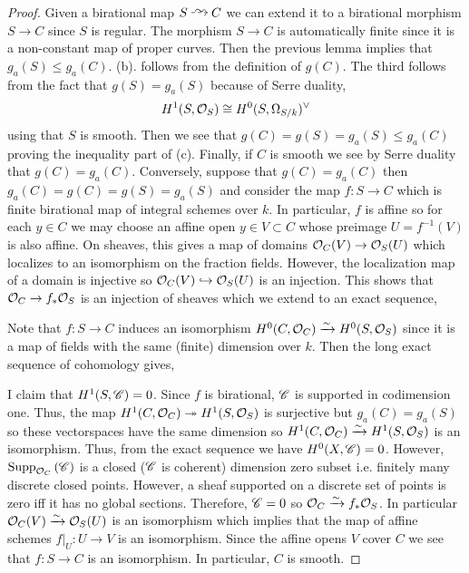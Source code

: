 \documentclass[12pt]{article}
\begin{document}
\begin{proof}
Given a birational map $S \birat C$ we can extend it to a birational morphism $S \to C$ since $S$ is regular. The morphism $S \to C$ is automatically finite since it is a non-constant map of proper curves. Then the previous lemma implies that $g_a(S) \le g_a(C)$. (b). follows from the definition of $g(C)$. The third follows from the fact that $g(S) = g_a(S)$  because of Serre duality, 
\[ H^1(S, \mathcal{O}_{S}) \cong H^0(S, \Omega_{S / k})^\vee \]
using that $S$ is smooth. Then we see that $g(C) = g(S) = g_a(S) \le g_a(C)$ proving the inequality part of (c). Finally, if $C$ is smooth we see by Serre duality that $g(C) = g_a(C)$. Conversely, suppose that $g(C) = g_a(C)$ then $g_a(C) = g(C) = g(S) = g_a(S)$ and consider the map $f : S \to C$ which is finite birational map of integral schemes over $k$. In particular, $f$ is affine so for each $y \in C$ we may choose an affine open $y \in V \subset C$ whose preimage $U = f^{-1}(V)$ is also affine. On sheaves, this gives a map of domains $\mathcal{O}_{C}(V) \to \mathcal{O}_{S}(U)$ which localizes to an isomorphism on the fraction fields. However, the localization map of a domain is injective so $\mathcal{O}_{C}(V) \hookrightarrow \mathcal{O}_{S}(U)$ is an injection. This shows that $\mathcal{O}_{C} \to f_* \mathcal{O}_{S}$ is an injection of sheaves which we extend to an exact sequence,
\begin{center}
\end{center} 
Note that $f : S \to C$ induces an isomorphism $H^0(C, \mathcal{O}_{C}) \xrightarrow{\sim} H^0(S, \mathcal{O}_{S})$ since it is a map of fields with the same (finite) dimension over $k$. Then the long exact sequence of cohomology gives,
\begin{center}
\end{center}
I claim that $H^1(S, \mathscr{C}) = 0$. Since $f$ is birational, $\mathscr{C}$ is supported in codimension one. Thus, the map $H^1(C, \mathcal{O}_{C}) \twoheadrightarrow H^1(S, \mathcal{O}_{S})$ is surjective but $g_a(C) = g_a(S)$ so these vectorspaces have the same dimension so $H^1(C, \mathcal{O}_{C}) \xrightarrow{\sim} H^1(S, \mathcal{O}_{S})$ is an isomorphism. Thus, from the exact sequence we have $H^0(X, \mathscr{C}) = 0$. However, $\mathrm{Supp}_{\mathcal{O}_{C}}\left(\mathscr{C} \right)$ is a closed ($\mathscr{C}$ is coherent) dimension zero subset i.e. finitely many discrete closed points. However, a sheaf supported on a discrete set of points is zero iff it has no global sections. Therefore, $\mathscr{C} = 0$ so $\mathcal{O}_{C} \xrightarrow{\sim} f_* \mathcal{O}_{S}$. In particular $\mathcal{O}_{C}(V) \xrightarrow{\sim} \mathcal{O}_{S}(U)$ is an isomorphism which implies that the map of affine schemes $f|_U : U \to V$ is an isomorphism. Since the affine opens $V$ cover $C$ we see that $f : S \to C$ is an isomorphism. In particular, $C$ is smooth. 
\end{proof}
\end{document}
